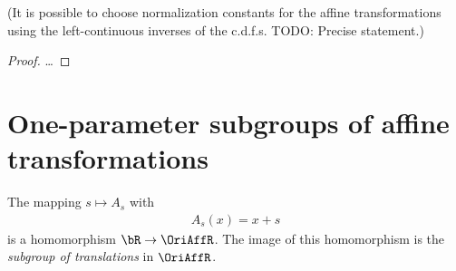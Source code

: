 \begin{lemma}
  \label{lemma:convergence-to-types-normalization}
  (It is possible to choose normalization constants for the affine
  transformations using the left-continuous inverses of the c.d.f.s.
  TODO: Precise statement.)
%
%
\end{lemma}
\begin{proof}
  \ldots
\end{proof}


\section{One-parameter subgroups of affine transformations}

\begin{definition}
  \label{def:translation-subgroup}
  The mapping $s \mapsto A_s$ with
  \begin{align*}
    A_s(x) = x + s
  \end{align*}
  is a homomorphism $\bR \to \OriAffR$. The image of this
  homomorphism is the \emph{subgroup of translations} in $\OriAffR$.
\end{definition}

